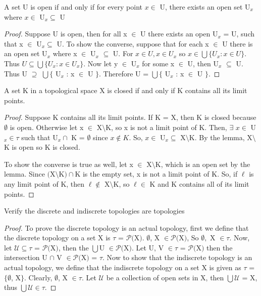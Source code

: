 \documentclass{article}
\begin{document}
	\begin{lemma}
	A set U is open if and only if for every point $x \in$ U, there exists an open set U$_x$ where $x \in $ U$_x \subseteq$ U
	\end{lemma}
	\begin{proof} Suppose U is open, then for all x $\in$ U there exists an open U$_x$ = U, such that x $\in$ U$_x \subseteq$ U.
	\newline
	To show the converse, suppose that for each x $\in$ U there is an open set U$_x$ where x $\in$ U$_x$ $\subseteq$ U. For $x \in U, x \in U_x$ so $x \in \bigcup \lbrace U_x : x \in U \rbrace$. Thus $U \subseteq \bigcup \lbrace U_x : x \in U_x \rbrace$. Now let y $\in$ U$_x$ for some x $\in$ U, then U$_x$ $\subseteq$ U. Thus U $\supseteq$ $\bigcup \lbrace$ U$_x$ : x $\in$ U $\rbrace$. Therefore U = $\bigcup \lbrace$ U$_x$ : x $\in$ U $\rbrace$.
	\end{proof}

	\begin{proposition}
		A set K in a topological space X is closed if and only if K contains all its limit points.
	\end{proposition}
	\begin{proof} Suppose K contains all its limit points.
	If K = X, then K is closed because $\emptyset$ is open.	Otherwise let x $\in$ X$\setminus$K, so x is not a limit point of K.	Then, $\exists$ $x \in$ U$_x \in \tau$ such that U$_x \cap$ K = $\emptyset$ since $x \not\in K$.	So, $x \in $ U$_x \subseteq$ X$\setminus$K.	By the lemma, X$\setminus$K is open so K is closed.

	To show the converse is true as well, let x $\in$ X$\setminus$K, which is an open set by the lemma. Since $($X$\setminus$K$)\cap$K is the empty set, x is not a limit point of K. So, if $\ell$ is any limit point of K, then $\ell \not\in$ X$\setminus$K, so $\ell \in$ K and K contains all of its limit points.
	\end{proof}

	\begin{proposition}
	Verify the discrete and indiscrete topologies are topologies
	\end{proposition}
	\begin{proof} To prove the discrete topology is an actual topology, first we define that the discrete topology on a set X is $\tau$ = $\mathcal{P}($X$)$.	$\emptyset$, X $\in \mathcal{P}($X$)$, So $\emptyset,$ X $\in \tau$. Now, let $\mathcal{U} \subseteq \tau$ = $\mathcal{P}($X$)$, then the $\bigcup$U $\in \mathcal{P}($X$)$. Let U, V $\in \tau$ = $\mathcal{P}($X$)$ then the intersection U $\cap$ V $\in \mathcal{P}($X$)$ = $\tau$. Now to show that the indiscrete topology is an actual topology, we define that the indiscrete topology on a set X is given as $\tau$ = $\lbrace \emptyset$, X$\rbrace$. Clearly, $\emptyset$, X $\in \tau$. Let $\mathcal{U}$ be a collection of open sets in X, then $\bigcup \mathcal{U}$ = X, thus $\bigcup \mathcal{U} \in \tau$.
	\end{proof}
\end{document}
